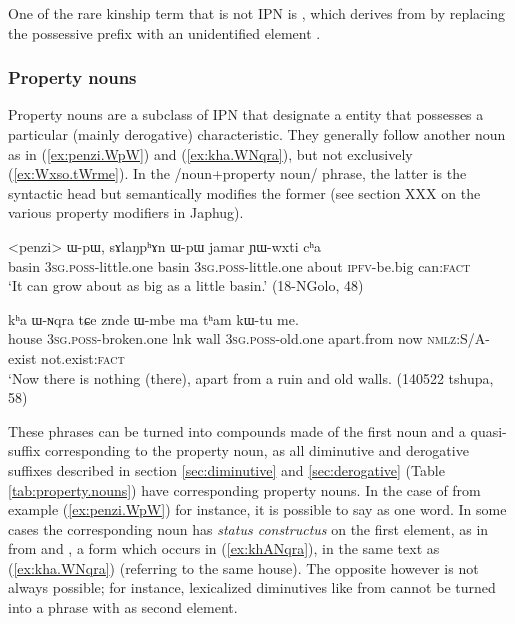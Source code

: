 One of the rare kinship term that is not IPN is , which derives from  by replacing the possessive prefix with an unidentified element .

\subsubsection{Property nouns} \label{sec:property.nouns}
Property nouns are a subclass of IPN that designate a entity that possesses a particular (mainly derogative) characteristic. They generally follow another noun as in (\ref{ex:penzi.WpW}) and (\ref{ex:kha.WNqra}), but not exclusively (\ref{ex:Wxso.tWrme}). In the /noun+property noun/ phrase, the latter is the syntactic head but semantically modifies the former (see section XXX on the various property modifiers in Japhug).  

\begin{exe}
\ex \label{ex:penzi.WpW}
 \gll <penzi> ɯ-pɯ, sɤlaŋpʰɤn ɯ-pɯ jamar ɲɯ-wxti cʰa  \\
 basin \textsc{3sg.poss}-little.one   basin \textsc{3sg.poss}-little.one  about \textsc{ipfv}-be.big can:\textsc{fact} \\
 \glt `It can grow about as big as a little basin.' (18-NGolo, 48)
\end{exe}

\begin{exe}
\ex \label{ex:kha.WNqra}
 \gll
kʰa ɯ-ɴqra tɕe znde ɯ-mbe ma tʰam kɯ-tu me. \\
house \textsc{3sg.poss}-broken.one lnk wall \textsc{3sg.poss}-old.one apart.from now \textsc{nmlz}:S/A-exist not.exist:\textsc{fact} \\ 
\glt `Now there is nothing (there), apart from a ruin and old walls. (140522 tshupa, 58)
\end{exe}

These phrases can be turned into compounds made of the first noun and a quasi-suffix corresponding to the property noun, as all diminutive and derogative suffixes described in section \ref{sec:diminutive} and \ref{sec:derogative} (Table \ref{tab:property.nouns}) have corresponding property nouns. In the case of   from example (\ref{ex:penzi.WpW}) for instance, it is possible to say  as one word. In some cases the corresponding noun has \textit{status constructus} on the first element, as in  from  and , a form which occurs in (\ref{ex:khANqra}), in the same text as  (\ref{ex:kha.WNqra}) (referring to the same house). The opposite however is not always possible; for instance, lexicalized diminutives like  from  cannot be turned into a phrase with  as second element.

